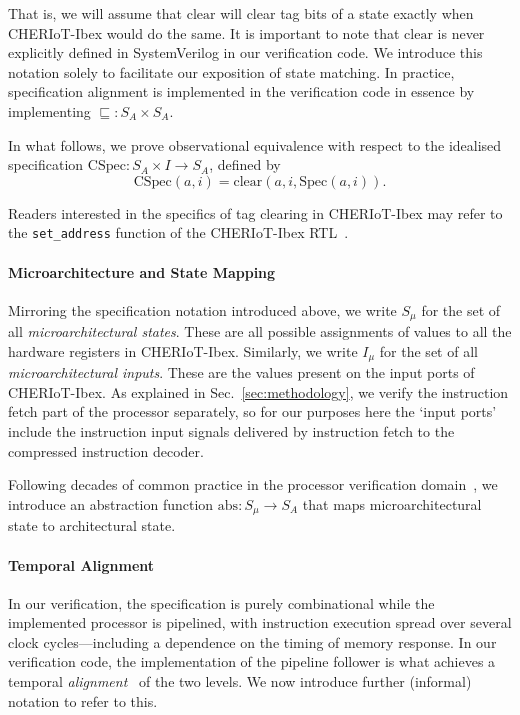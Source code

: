 \documentclass[10pt,conference]{IEEEtran}
\begin{document}
\noindent That is, we will assume that $\mathrm{clear}$ will clear tag bits
of a state exactly when CHERIoT-Ibex would do the same. It is important to
note that $\mathrm{clear}$ is never explicitly defined in SystemVerilog in
our verification code. We introduce this notation solely to facilitate our
exposition of state matching. In practice, specification alignment is
implemented in the verification code in essence by implementing
$\sqsubseteq : S_A \times S_A$.

In what follows, we prove observational equivalence with respect to the idealised
specification $\mathrm{CSpec} : S_A \times I \to S_A$, defined by
\[
\mathrm{CSpec}(a, i) = \mathrm{clear}(a, i, \mathrm{Spec}(a, i)).
\]

\noindent Readers interested in the specifics of tag clearing in
CHERIoT-Ibex may refer to the \verb|set_address| function of the CHERIoT-Ibex
RTL~\cite{cheriot-ibex}.

\paragraph{Microarchitecture and State Mapping}

Mirroring the specification notation introduced above, we write $S_\mu$ for
the set of all \textit{microarchitectural states}. These are all possible
assignments of values to all the hardware registers in
CHERIoT-Ibex. Similarly, we write $I_\mu$ for the set of all
\textit{microarchitectural inputs}. These are the values present on the
input ports of CHERIoT-Ibex. As explained in Sec.~\ref{sec:methodology}, we
verify the instruction fetch part of the processor separately, so for our
purposes here the `input ports' include the instruction input signals delivered by
instruction fetch to the compressed instruction decoder.

Following decades of common practice in the processor verification
domain~\cite{aagaard}, we introduce an abstraction function $\mathrm{abs} :
S_\mu \to S_A$ that maps microarchitectural state to architectural state.

\paragraph{Temporal Alignment}

In our verification, the specification is purely combinational while the
implemented processor is pipelined, with instruction execution spread over
several clock cycles---including a dependence on the timing of memory
response. In our verification code, the implementation of the pipeline
follower is what achieves a temporal \textit{alignment}~\cite{aagaard} of the two levels. We 
now introduce further (informal) notation to refer to this.
\end{document}
